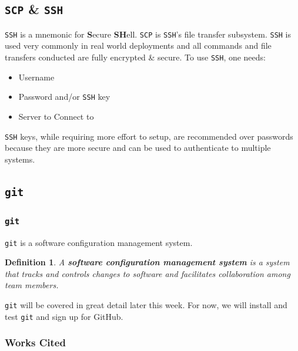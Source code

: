 \documentclass[aspectratio=169]{beamer}
\newtheorem{defn}{Definition}
\begin{document}
\subsection{\texttt{SCP} \& \texttt{SSH}}
\begin{frame}
\texttt{SSH} is a mnemonic for \textbf{S}ecure \textbf{SH}ell. \texttt{SCP} is \texttt{SSH}'s file transfer subsystem. \texttt{SSH} is used very commonly in real world deployments and all commands and file transfers conducted are fully encrypted \& secure. To use \texttt{SSH}, one needs:
\begin{itemize}
	\item Username
	\item Password and/or \texttt{SSH} key
	\item Server to Connect to
\end{itemize}
\texttt{SSH} keys, while requiring more effort to setup, are recommended over passwords because they are more secure and can be used to authenticate to multiple systems.
\end{frame}

\subsection{\texttt{git}}
\begin{frame}
\frametitle{\texttt{git}}
\texttt{git} is a software configuration management system.
\pause
\begin{defn}
A \textbf{software configuration management system} is a system that tracks and controls changes to software and facilitates collaboration among team members.
\end{defn}
\pause
\texttt{git} will be covered in great detail later this week. For now, we will install and test \texttt{git} and sign up for GitHub.
\end{frame}

\begin{frame}
\frametitle{Works Cited}

\end{frame}
\end{document}
